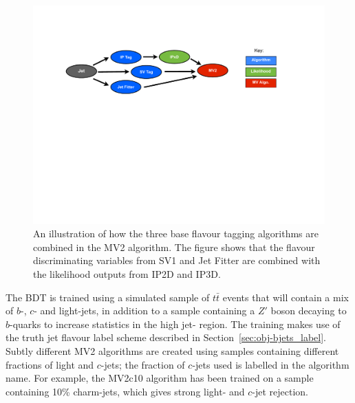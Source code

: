 \begin{figure}[!htb]
  \begin{center}
    \includegraphics[width=1.0\textwidth]{figs/Objects/MV2_schem.pdf}
    \caption[An illustration of how the three base flavour tagging algorithms are combined in the MV2 algorithm.]
            {An illustration of how the three base flavour tagging algorithms are combined in the MV2 algorithm.
              The figure shows that the flavour discriminating variables from SV1 and Jet Fitter are combined with the likelihood outputs from IP2D and IP3D.}
    \label{fig:obj-MV2_schem}
  \end{center}
  \vspace{-1em}
\end{figure}

The BDT is trained using a simulated sample of $t\bar{t}$ events that will contain a mix of  $b$-, $c$- and light-jets,
in addition to a sample containing a $Z'$ boson decaying to $b$-quarks to increase statistics in the high jet-\pT{} region.
The training makes use of the truth jet flavour label scheme described in Section~\ref{sec:obj-bjets_label}.
Subtly different MV2 algorithms are created using samples containing different fractions of light and $c$-jets;
the fraction of $c$-jets used is labelled in the algorithm name.
For example, the MV2c10 algorithm has been trained on a sample containing 10\% charm-jets, which gives strong light- and $c$-jet rejection.

